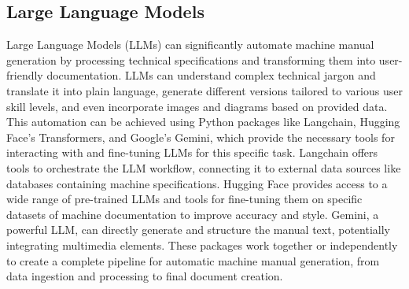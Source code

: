\documentclass{article}%
\begin{document}
%
\subsection{Large Language Models}%
\label{subsec:LargeLanguageModels}%
Large Language Models (LLMs) can significantly automate machine manual generation by processing technical specifications and transforming them into user{-}friendly documentation.  LLMs can understand complex technical jargon and translate it into plain language, generate different versions tailored to various user skill levels, and even incorporate images and diagrams based on provided data.  This automation can be achieved using Python packages like Langchain, Hugging Face's Transformers, and Google's Gemini, which provide the necessary tools for interacting with and fine{-}tuning LLMs for this specific task.\newline%
Langchain offers tools to orchestrate the LLM workflow, connecting it to external data sources like databases containing machine specifications. Hugging Face provides access to a wide range of pre{-}trained LLMs and tools for fine{-}tuning them on specific datasets of machine documentation to improve accuracy and style.  Gemini, a powerful LLM, can directly generate and structure the manual text, potentially integrating multimedia elements.  These packages work together or independently to create a complete pipeline for automatic machine manual generation, from data ingestion and processing to final document creation.

%
\end{document}

